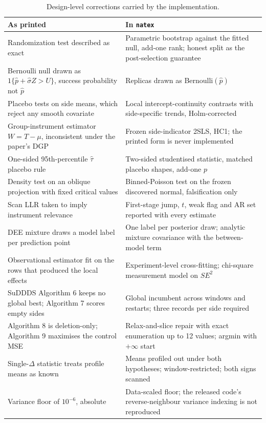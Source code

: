 \documentclass[11pt]{article}
\newcommand{\natex}{\texttt{natex}}
\begin{document}
\begin{table}[t]
\centering
\small
\caption{Design-level corrections carried by the implementation.}
\label{tab:audit}
\begin{tabular}{@{}p{6.2cm}p{8.6cm}@{}}
\toprule
As printed & In \natex{} \\
\midrule
Randomization test described as exact & Parametric bootstrap against the fitted null, add-one rank; honest split as the post-selection guarantee \\
Bernoulli null drawn as $1\{\hat p + \hat\sigma Z > U\}$, success probability not $\hat p$ & Replicas drawn as Bernoulli$(\hat p)$ \\
Placebo tests on side means, which reject any smooth covariate & Local intercept-continuity contrasts with side-specific trends, Holm-corrected \\
Group-instrument estimator $W = T - \mu$, inconsistent under the paper's DGP & Frozen side-indicator 2SLS, HC1; the printed form is never implemented \\
One-sided 95th-percentile $\hat\tau$ placebo rule & Two-sided studentised statistic, matched placebo shapes, add-one $p$ \\
Density test on an oblique projection with fixed critical values & Binned-Poisson test on the frozen discovered normal, falsification only \\
Scan LLR taken to imply instrument relevance & First-stage jump, $t$, weak flag and AR set reported with every estimate \\
DEE mixture draws a model label per prediction point & One label per posterior draw; analytic mixture covariance with the between-model term \\
Observational estimator fit on the rows that produced the local effects & Experiment-level cross-fitting; chi-square measurement model on $SE^2$ \\
SuDDDS Algorithm 6 keeps no global best; Algorithm 7 scores empty sides & Global incumbent across windows and restarts; three records per side required \\
Algorithm 8 is deletion-only; Algorithm 9 maximises the control MSE & Relax-and-slice repair with exact enumeration up to 12 values; argmin with $+\infty$ start \\
Single-$\Delta$ statistic treats profile means as known & Means profiled out under both hypotheses; window-restricted; both signs scanned \\
Variance floor of $10^{-6}$, absolute & Data-scaled floor; the released code's reverse-neighbour variance indexing is not reproduced \\
\bottomrule
\end{tabular}
\end{table}
\end{document}
